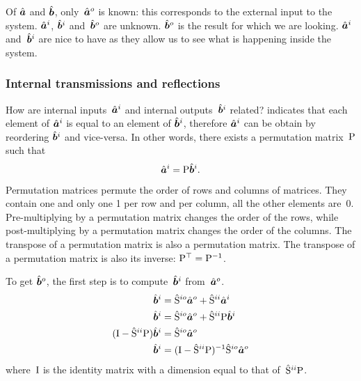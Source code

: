 Of $\hat{\bm{a}}$ and $\hat{\bm{b}}$, only~$\hat{\bm{a}}^o$ is known: this corresponds to the external input to the system.
$\hat{\bm{a}}^i$, $\hat{\bm{b}}^i$ and~$\hat{\bm{b}}^o$ are unknown.
$\hat{\bm{b}}^o$ is the result for which we are looking.
$\hat{\bm{a}}^i$ and~$\hat{\bm{b}}^i$ are nice to have as they allow us to see what is happening inside the system.




\subsubsection{Internal transmissions and reflections}

How are internal inputs~$\hat{\bm{a}}^i$ and internal outputs~$\hat{\bm{b}}^i$ related?
 indicates that each element of $\hat{\bm{a}}^i$ is equal to an element of $\hat{\bm{b}}^i$, therefore $\hat{\bm{a}}^i$ can be obtain by reordering $\hat{\bm{b}}^i$ and vice-versa.
In other words, there exists a permutation matrix~$\mathrm{P}$ such that
\begin{equation}
    \hat{\bm{a}}^i = \mathrm{P} \hat{\bm{b}}^i \text{.} \label{eq:relation_ai_bi}
\end{equation}
Permutation matrices permute the order of rows and columns of matrices.
They contain one and only one 1 per row and per column, all the other elements are~0.
Pre-multiplying by a permutation matrix changes the order of the rows,
while post-multiplying by a permutation matrix changes the order of the columns.
The transpose of a permutation matrix is also a permutation matrix.
The transpose of a permutation matrix is also its inverse: $\mathrm{P}^\top = \mathrm{P}^{-1}$.

To get $\hat{\bm{b}}^o$, the first step is to compute~$\hat{\bm{b}}^i$ from~$\hat{\bm{a}}^o$.
\begin{subequations}
    \label{eq:compute_bi}
    \begin{align}
        \hat{\bm{b}}^i
        &=
        \hat{\mathrm{S}}^{io} \hat{\bm{a}}^o + \hat{\mathrm{S}}^{ii}\hat{\bm{a}}^i
        \label{eq:compute_bi_ai}
        \\
        \hat{\bm{b}}^i
        &=
        \hat{\mathrm{S}}^{io} \hat{\bm{a}}^o + \hat{\mathrm{S}}^{ii} \mathrm{P} \hat{\bm{b}}^i
        \label{eq:compute_bi_bi}
        \\
        (\mathrm{I} - \hat{\mathrm{S}}^{ii}\mathrm{P}) \hat{\bm{b}}^i
        &=
        \hat{\mathrm{S}}^{io} \hat{\bm{a}}^o
        \label{eq:compute_bi_solve}
        \\
        \hat{\bm{b}}^i
        &=
        (\mathrm{I} - \hat{\mathrm{S}}^{ii} \mathrm{P})^{-1} \hat{\mathrm{S}}^{io} \hat{\bm{a}}^o
        \label{eq:compute_bi_invert}
    \end{align}
\end{subequations}
where~$\mathrm{I}$ is the identity matrix with a dimension equal to that of~$\hat{\mathrm{S}}^{ii}\mathrm{P}$.

